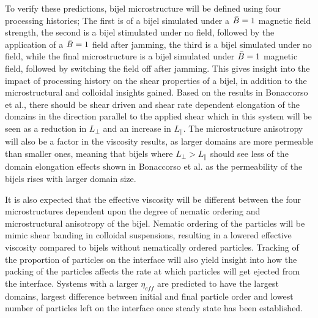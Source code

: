 To verify these predictions, bijel microstructure will be defined using four processing histories; The first is of a bijel simulated under a $\Bar{B} = 1$ magnetic field strength, the second is a bijel stimulated under no field, followed by the application of a $\Bar{B} = 1$ field after jamming, the third is a bijel simulated under no field, while the final microstructure is a bijel simulated under $\Bar{B} = 1$ magnetic field, followed by switching the field off after jamming. This gives insight into the impact of processing history on the shear properties of a bijel, in addition to the microstructural and colloidal insights gained. Based on the results in Bonaccorso et al., there should be shear driven and shear rate dependent elongation of the domains in the direction parallel to the applied shear which in this system will be seen as a reduction in $L_{\perp}$ and an increase in $L_{\parallel}$. \cite{bonaccorso_shear_2020} The microstructure anisotropy will also be a factor in the viscosity results, as larger domains are more permeable than smaller ones, meaning that bijels where $L_{\perp} > L_{\parallel}$ should see less of the domain elongation effects shown in Bonaccorso et al. as the permeability of the bijels rises with larger domain size. \cite{bonaccorso_shear_2020}

It is also expected that the effective viscosity will be different between the four microstructures dependent upon the degree of nematic ordering and microstructural anisotropy of the bijel. Nematic ordering of the particles will be mimic shear banding in colloidal suspensions, resulting in a lowered effective viscosity compared to bijels without nematically ordered particles. \cite{xu_relation_2013, vermant_flow-induced_2005} Tracking of the proportion of particles on the interface will also yield insight into how the packing of the particles affects the rate at which particles will get ejected from the interface. Systems with a larger $\eta_{eff}$ are predicted to have the largest domains, largest difference between initial and final particle order and lowest number of particles left on the interface once steady state has been established. 

